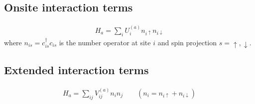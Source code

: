 \documentclass[letterpaper,10pt,english]{sphinxmanual}
\begin{document}
\subsection{On\sphinxhyphen{}site interaction terms}
\label{\detokenize{models:on-site-interaction-terms}}\begin{equation*}
\begin{split}H_a = \sum_{i} U^{(a)}_i n_{i\uparrow} n_{i\downarrow}\end{split}
\end{equation*}
\sphinxAtStartPar
where \(n_{is}=c^\dagger_{is} c_{is}\) is the number operator at site \(i\) and spin projection \(s=\uparrow,\downarrow\).


\subsection{Extended interaction terms}
\label{\detokenize{models:extended-interaction-terms}}\begin{equation*}
\begin{split}H_a = \sum_{ij} V^{(a)}_{ij} n_i n_j \qquad (n_i = n_{i\uparrow}+n_{i\downarrow})\end{split}
\end{equation*}
\end{document}

